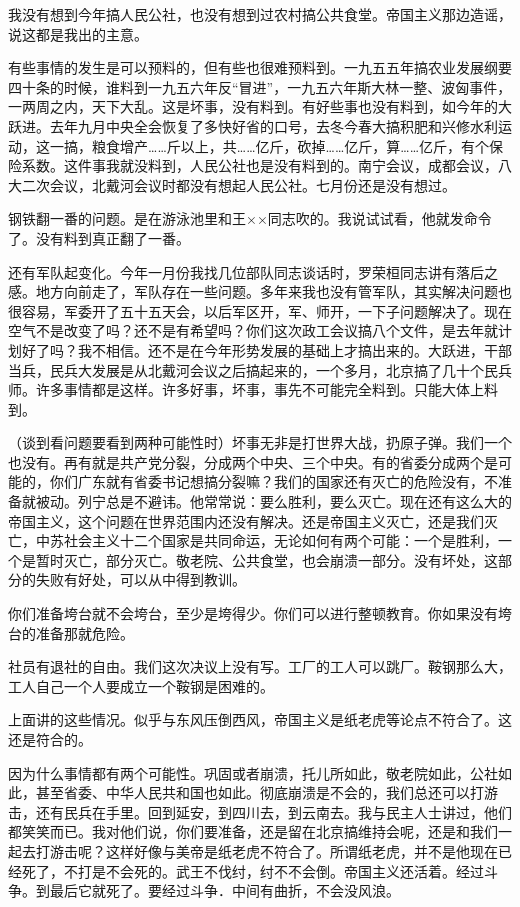 我没有想到今年搞人民公社，也没有想到过农村搞公共食堂。帝国主义那边造谣，说这都是我出的主意。

有些事情的发生是可以预料的，但有些也很难预料到。一九五五年搞农业发展纲要四十条的时候，谁料到一九五六年反“冒进”，一九五六年斯大林一整、波匈事件，一两周之内，天下大乱。这是坏事，没有料到。有好些事也没有料到，如今年的大跃进。去年九月中央全会恢复了多快好省的口号，去冬今春大搞积肥和兴修水利运动，这一搞，粮食增产……斤以上，共……亿斤，砍掉……亿斤，算……亿斤，有个保险系数。这件事我就没料到，人民公社也是没有料到的。南宁会议，成都会议，八大二次会议，北戴河会议时都没有想起人民公社。七月份还是没有想过。

钢铁翻一番的问题。是在游泳池里和王××同志吹的。我说试试看，他就发命令了。没有料到真正翻了一番。

还有军队起变化。今年一月份我找几位部队同志谈话时，罗荣桓同志讲有落后之感。地方向前走了，军队存在一些问题。多年来我也没有管军队，其实解决问题也很容易，军委开了五十五天会，以后军区开，军、师开，一下子问题解决了。现在空气不是改变了吗？还不是有希望吗？你们这次政工会议搞八个文件，是去年就计划好了吗？我不相信。还不是在今年形势发展的基础上才搞出来的。大跃进，干部当兵，民兵大发展是从北戴河会议之后搞起来的，一个多月，北京搞了几十个民兵师。许多事情都是这样。许多好事，坏事，事先不可能完全料到。只能大体上料到。

（谈到看问题要看到两种可能性时）坏事无非是打世界大战，扔原子弹。我们一个也没有。再有就是共产党分裂，分成两个中央、三个中央。有的省委分成两个是可能的，你们广东就有省委书记想搞分裂嘛？我们的国家还有灭亡的危险没有，不准备就被动。列宁总是不避讳。他常常说：要么胜利，要么灭亡。现在还有这么大的帝国主义，这个问题在世界范围内还没有解决。还是帝国主义灭亡，还是我们灭亡，中苏社会主义十二个国家是共同命运，无论如何有两个可能：一个是胜利，一个是暂时灭亡，部分灭亡。敬老院、公共食堂，也会崩溃一部分。没有坏处，这部分的失败有好处，可以从中得到教训。

你们准备垮台就不会垮台，至少是垮得少。你们可以进行整顿教育。你如果没有垮台的准备那就危险。

社员有退社的自由。我们这次决议上没有写。工厂的工人可以跳厂。鞍钢那么大，工人自己一个人要成立一个鞍钢是困难的。

上面讲的这些情况。似乎与东风压倒西风，帝国主义是纸老虎等论点不符合了。这还是符合的。

因为什么事情都有两个可能性。巩固或者崩溃，托儿所如此，敬老院如此，公社如此，甚至省委、中华人民共和国也如此。彻底崩溃是不会的，我们总还可以打游击，还有民兵在手里。回到延安，到四川去，到云南去。我与民主人士讲过，他们都笑笑而已。我对他们说，你们要准备，还是留在北京搞维持会呢，还是和我们一起去打游击呢？这样好像与美帝是纸老虎不符合了。所谓纸老虎，并不是他现在已经死了，不打是不会死的。武王不伐纣，纣不不会倒。帝国主义还活着。经过斗争。到最后它就死了。要经过斗争．中间有曲折，不会没风浪。

